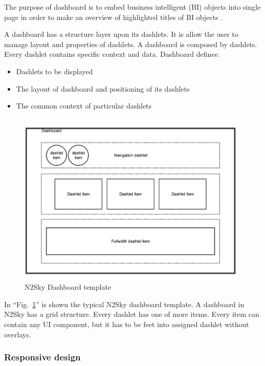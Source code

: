 The purpose of dashboard is to embed business intelligent (BI) objects into single page in order to make an overview of highlighted titles of BI objects \cite{dashboards_book}.

A dashboard has a structure layer upon its dashlets. It is allow the user to manage layout and properties of dashlets. A dashboard is composed by dashlets. Every dashlet contains specific context and data. Dashboard defines: 
\begin{itemize}
\item Dashlets to be displayed
\item The layout of dashboard and positioning of its dashlets
\item The common context of particular dashlets
\end{itemize}


\begin{figure}[htbp]
\begin{center}
  \includegraphics[width=\linewidth]{components/3/components/dashboard_template.png}
  \caption{N2Sky Dashboard template}
  \label{fig:dashboard_template}
\end{center}
\end{figure}

In ``Fig.~\ref{fig:dashboard_template}'' is shown the typical N2Sky dashboard template. A dashboard in N2Sky has a grid structure. Every dashlet has one of more items. Every item can contain any UI component, but it has to be feet into assigned dashlet without overlays. 



\subsubsection{Responsive design}\label{Responsive design}

